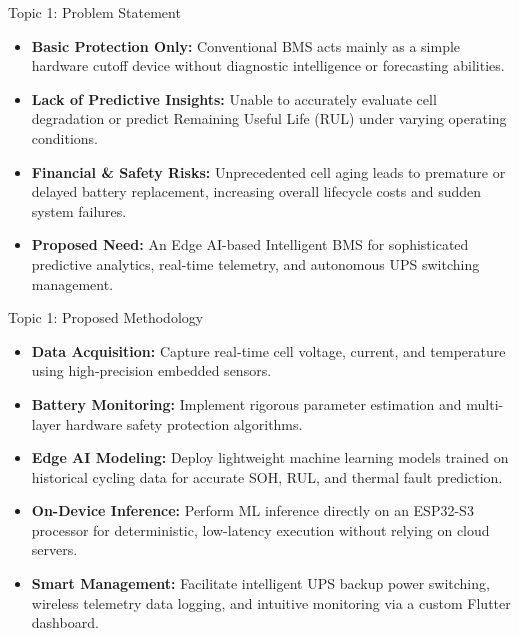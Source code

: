 \documentclass{beamer}
\begin{document}
\begin{frame}{Topic 1: Problem Statement}
\begin{itemize}
  \item \textbf{Basic Protection Only:} Conventional BMS acts mainly as a simple hardware cutoff device without diagnostic intelligence or forecasting abilities.
  \vspace{0.3cm}
  \item \textbf{Lack of Predictive Insights:} Unable to accurately evaluate cell degradation or predict Remaining Useful Life (RUL) under varying operating conditions.
  \vspace{0.3cm}
  \item \textbf{Financial \& Safety Risks:} Unprecedented cell aging leads to premature or delayed battery replacement, increasing overall lifecycle costs and sudden system failures.
  \vspace{0.3cm}
  \item \textbf{Proposed Need:} An Edge AI-based Intelligent BMS for sophisticated predictive analytics, real-time telemetry, and autonomous UPS switching management.
\end{itemize}
\end{frame}

\begin{frame}{Topic 1: Proposed Methodology}
\begin{itemize}
  \item \textbf{Data Acquisition:} Capture real-time cell voltage, current, and temperature using high-precision embedded sensors.
  \vspace{0.2cm}
  \item \textbf{Battery Monitoring:} Implement rigorous parameter estimation and multi-layer hardware safety protection algorithms.
  \vspace{0.2cm}
  \item \textbf{Edge AI Modeling:} Deploy lightweight machine learning models trained on historical cycling data for accurate SOH, RUL, and thermal fault prediction.
  \vspace{0.2cm}
  \item \textbf{On-Device Inference:} Perform ML inference directly on an ESP32-S3 processor for deterministic, low-latency execution without relying on cloud servers.
  \vspace{0.2cm}
  \item \textbf{Smart Management:} Facilitate intelligent UPS backup power switching, wireless telemetry data logging, and intuitive monitoring via a custom Flutter dashboard.
\end{itemize}
\end{frame}
\end{document}
